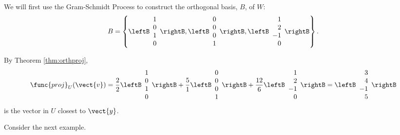 \begin{solution}
We will first use the Gram-Schmidt Process to construct the orthogonal basis, $B$, of $W$:
\[ B=\left\{
\leftB\begin{array}{c} 1\\ 0\\ 1\\ 0 \end{array}\rightB,
\leftB\begin{array}{c} 0\\ 0\\ 0\\ 1 \end{array}\rightB,
\leftB\begin{array}{r} 1\\ 2\\ -1\\ 0 \end{array}\rightB
\right\}.\]

By Theorem \ref{thm:orthproj},
\[ \func{proj}_U(\vect{v}) = 
\frac{2}{2} \leftB\begin{array}{c} 1\\ 0\\ 1\\ 0 \end{array}\rightB +
\frac{5}{1}\leftB\begin{array}{c} 0\\ 0\\ 0\\ 1 \end{array}\rightB +
\frac{12}{6}\leftB\begin{array}{r} 1\\ 2\\ -1\\ 0 \end{array}\rightB
= \leftB\begin{array}{r} 3\\ 4\\ -1\\ 5 \end{array}\rightB
\]
is the vector in $U$ closest to $\vect{y}$.
\end{solution}

Consider the next example. 

